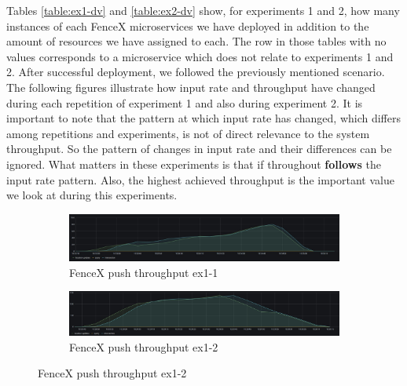 \documentclass[a4]{report}
\begin{document}
    Tables \ref{table:ex1-dv} and \ref{table:ex2-dv} show, for experiments 1 and 2, how many instances of each FenceX
    microservices we have deployed in addition to the amount of resources we have assigned to each.
    The row in those tables with no values corresponds to a microservice which does not relate to experiments 1 and 2.
    After successful deployment, we followed the previously mentioned scenario.
    The following figures illustrate how input rate and throughput have changed during each repetition of experiment
    1 and also during experiment 2.
    It is important to note that the pattern at which input rate has changed, which differs among repetitions and
    experiments, is not of direct relevance to the system throughput.
    So the pattern of changes in input rate and their differences can be ignored.
    What matters in these experiments is that if throughout \textbf{follows} the input rate pattern.
    Also, the highest achieved throughput is the important value we look at during this experiments.

    \begin{figure}
        \centering
        \begin{subfigure}[b]{\textwidth}
            \centering
            \caption{FenceX push throughput ex1-1}
            \label{fig:ex1-1}
            \includegraphics[width=\textwidth, height=0.3\textheight, scale=2]{images/evaluation/ex1-benchmarking(15,6).png}
        \end{subfigure}

        \begin{subfigure}[b]{\textwidth}
            \centering
            \caption{FenceX push throughput ex1-2}
            \label{fig:ex1-2}
            \includegraphics[width=\textwidth, height=0.3\textheight, scale=2]{images/evaluation/ex1-benchmarking(19,7).png}
        \end{subfigure}
    \end{figure}
\end{document}

